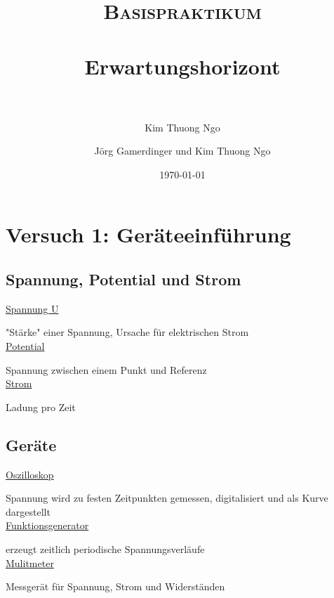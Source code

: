 \documentclass[paper=a4, fontsize=11pt]{scrartcl}
\author{Kim Thuong Ngo}
\title{
\normalfont \normalsize
\textsc{Basispraktikum} \\ [25pt]
\horrule{0.5pt} \\[0.4cm]
\huge Erwartungshorizont \\
\horrule{2pt} \\[0.5cm]
}
\author{Jörg Gamerdinger und Kim Thuong Ngo}
\date{\normalsize\today}
\numberwithin{equation}{section}
\numberwithin{figure}{section}
\numberwithin{table}{section}
\begin{document}
\maketitle

\newpage

\tableofcontents


\newpage

\section{Versuch 1: Geräteeinführung}


\subsection{Spannung, Potential und Strom}

\underline{Spannung U}

"Stärke" einer Spannung, Ursache für elektrischen Strom \\

\underline{Potential}

Spannung zwischen einem Punkt und Referenz \\

\underline{Strom}

Ladung pro Zeit \\


\subsection{Geräte}

\underline{Oszilloskop}

Spannung wird zu festen Zeitpunkten gemessen, digitalisiert und als Kurve dargestellt \\

\underline{Funktionsgenerator}

erzeugt zeitlich periodische Spannungsverläufe \\

\underline{Mulitmeter}

Messgerät für Spannung, Strom und Widerständen \\
\end{document}
